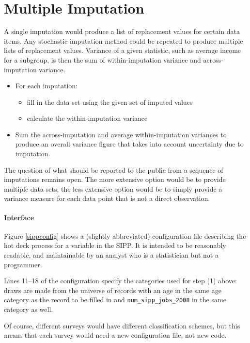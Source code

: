 \documentclass{article}
\newif\ifimputation
\def\tighten{ \setlength{\itemsep}{1pt}
    \setlength{\parskip}{0pt}}
\begin{document}
\section{Multiple Imputation}
A single imputation would produce a list of replacement
values for certain data items. Any stochastic imputation method could be repeated
to produce multiple lists of replacement values. Variance of a given statistic,
such as average income for a subgroup, is then the sum of within-imputation variance and
across-imputation variance.

\begin{itemize}
\tighten
\item For each imputation:
    \begin{itemize}
\tighten
    \item fill in the data set using the given set of imputed values
    \item calculate the within-imputation variance
    \end{itemize}
\item Sum the across-imputation and average within-imputation variances to
produce an overall variance figure that takes into account uncertainty due to imputation.
\end{itemize}

The question of what should be reported to the public from a sequence of imputations
remains open. The more extensive option would be to provide multiple data sets; the less
extensive option would be to simply provide a variance measure for each data point that
is not a direct observation.


\ifimputation
        \paragraph{Interface} Figure \ref{sippconfig} shows a (slightly abbreviated)
        configuration file describing the hot deck process for a variable in the SIPP.
        It is intended to be reasonably readable, and maintainable by an analyst who is
        a statistician but not a programmer.

        Lines 11--18 of the configuration specify the
        categories used for step (1) above: draws are made from the universe of records with an
        age in the same age category as the record to be filled in and {\tt num\_sipp\_jobs\_2008} in the same
        category as well.

        Of course, different surveys would have different classification schemes, but
        this means that each survey would need a new configuration file, not new code.
\end{document}
